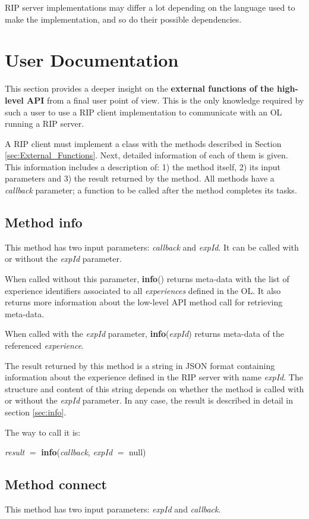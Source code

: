 RIP server implementations may differ a lot depending on the language used to make the implementation, and so do their possible dependencies.

\section{User Documentation}
\label{sec:User_Doc}
This section provides a deeper insight on the \textbf{external functions of the high-level API} from a final user point of view. This is the only knowledge required by such a user to use a RIP client implementation to communicate with an OL running a RIP server.

A RIP client must implement a class with the methods described in Section \ref{sec:External_Functions}. Next, detailed information of each of them is given. This information includes a description of: 1) the method itself, 2) its input parameters and 3) the result returned by the method. All methods have a \textit{callback} parameter; a function to be called after the method completes its tasks.

\subsection{Method info}
This method has two input parameters: \textit{callback} and  \textit{expId}. It can be called with or without the \textit{expId} parameter.

When called without this parameter, \textbf{info}() returns meta-data with the list of experience identifiers associated to all \textit{experiences} defined in the OL. It also returns more information about the low-level API method call for retrieving meta-data.

When called with the \textit{expId} parameter, \textbf{info}(\textit{expId}) returns meta-data of the referenced \textit{experience}.

The result returned by this method is a string in JSON format containing information about the experience defined in the RIP server with name \textit{expId}. The structure and content of this string depends on whether the method is called with or without the \textit{expId} parameter. In any case, the result is described in detail in section \ref{sec:info}.

The way to call it is:

\textit{result} $=$ \textbf{info}(\textit{callback}, \textit{expId} $=$ null)

\subsection{Method connect}
This method has two input parameters: \textit{expId} and \textit{callback}.

